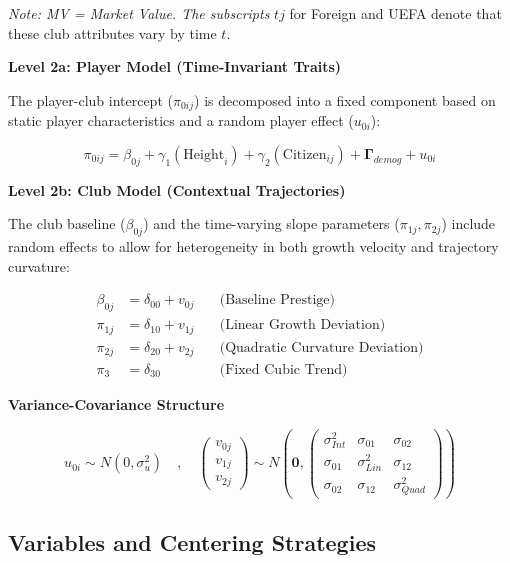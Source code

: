 \documentclass[
  12pt,
]{article}
\begin{document}
\emph{Note: MV = Market Value. The subscripts} \({tj}\) for Foreign and
UEFA denote that these club attributes vary by time \(t\).

\textbf{Level 2a: Player Model (Time-Invariant Traits)}

The player-club intercept (\(\pi_{0ij}\)) is decomposed into a fixed
component based on static player characteristics and a random player
effect (\(u_{0i}\)):

\[ \pi_{0ij} = \beta_{0j} + \gamma_{1}(\text{Height}_{i}) + \gamma_{2}(\text{Citizen}_{ij}) + \mathbf{\Gamma}_{demog} + u_{0i} \]

\textbf{Level 2b: Club Model (Contextual Trajectories)}

The club baseline (\(\beta_{0j}\)) and the time-varying slope parameters
(\(\pi_{1j}, \pi_{2j}\)) include random effects to allow for
heterogeneity in both growth velocity and trajectory curvature:

\[ \begin{aligned} \beta_{0j} &= \delta_{00} + v_{0j} \quad &\text{(Baseline Prestige)} \\ \pi_{1j} &= \delta_{10} + v_{1j} \quad &\text{(Linear Growth Deviation)} \\ \pi_{2j} &= \delta_{20} + v_{2j} \quad &\text{(Quadratic Curvature Deviation)} \\ \pi_{3} &= \delta_{30} \quad &\text{(Fixed Cubic Trend)} \end{aligned} \]

\textbf{Variance-Covariance Structure}

\[ u_{0i} \sim N(0, \sigma^2_{u}) \quad , \quad  \begin{pmatrix} v_{0j} \\ v_{1j} \\ v_{2j} \end{pmatrix} \sim N \left( \mathbf{0}, \begin{pmatrix} \sigma^2_{Int} & \sigma_{01} & \sigma_{02} \\ \sigma_{01} & \sigma^2_{Lin} & \sigma_{12} \\ \sigma_{02} & \sigma_{12} & \sigma^2_{Quad} \end{pmatrix} \right) \]

\subsection{Variables and Centering
Strategies}\label{variables-and-centering-strategies}
\end{document}
